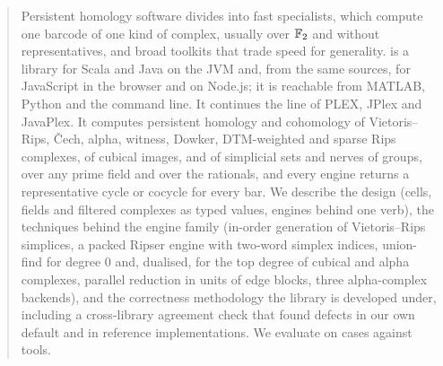 \begin{abstract}
Persistent homology software divides into fast specialists, which compute one barcode of one kind of complex, usually
over $\Ftwo$ and without representatives, and broad toolkits that trade speed for generality.
\tdaj{} is a library for Scala and Java on the JVM and, from the same sources, for JavaScript in the browser and on
Node.js; it is reachable from MATLAB, Python and the command line. It continues the line of PLEX, JPlex and JavaPlex.
It computes persistent homology and cohomology of Vietoris--Rips, \v{C}ech, alpha, witness, Dowker, DTM-weighted and sparse
Rips complexes, of cubical images, and of simplicial sets and nerves of groups, over any prime field and over the
rationals, and every engine returns a representative cycle or cocycle for every bar.
We describe the design (cells, fields and filtered complexes as typed values, engines behind one verb), the techniques
behind the engine family (in-order generation of Vietoris--Rips simplices, a packed Ripser engine with two-word simplex
indices, union-find for degree $0$ and, dualised, for the top degree of cubical and alpha complexes, parallel reduction
in units of edge blocks, three alpha-complex backends), and the correctness methodology the library is developed under,
including a cross-library agreement check that found defects in our own default and in reference implementations.
We evaluate on  cases against  tools.
\end{abstract}
